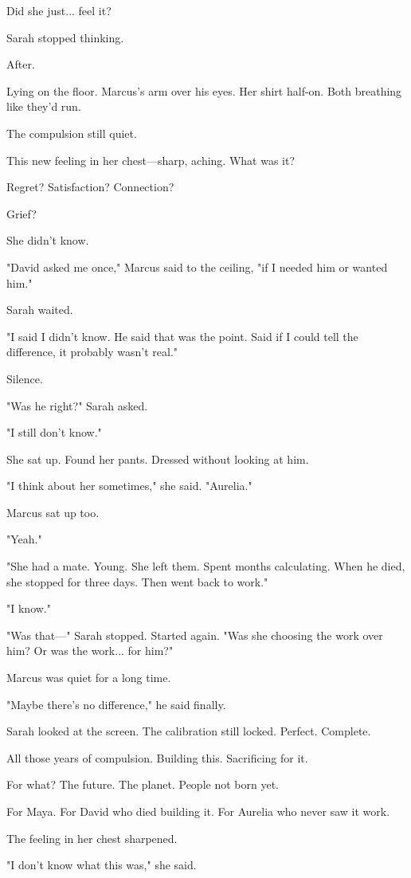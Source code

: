 Did she just... feel it?

Sarah stopped thinking.

\scenebreak

After.

Lying on the floor. Marcus's arm over his eyes. Her shirt half-on. Both breathing like they'd run.

The compulsion still quiet.

This new feeling in her chest—sharp, aching. What was it?

Regret? Satisfaction? Connection?

Grief?

She didn't know.

"David asked me once," Marcus said to the ceiling, "if I needed him or wanted him."

Sarah waited.

"I said I didn't know. He said that was the point. Said if I could tell the difference, it probably wasn't real."

Silence.

"Was he right?" Sarah asked.

"I still don't know."

She sat up. Found her pants. Dressed without looking at him.

"I think about her sometimes," she said. "Aurelia."

Marcus sat up too.

"Yeah."

"She had a mate. Young. She left them. Spent months calculating. When he died, she stopped for three days. Then went back to work."

"I know."

"Was that—" Sarah stopped. Started again. "Was she choosing the work over him? Or was the work... for him?"

Marcus was quiet for a long time.

"Maybe there's no difference," he said finally.

Sarah looked at the screen. The calibration still locked. Perfect. Complete.

All those years of compulsion. Building this. Sacrificing for it.

For what? The future. The planet. People not born yet.

For Maya. For David who died building it. For Aurelia who never saw it work.

The feeling in her chest sharpened.

"I don't know what this was," she said.


